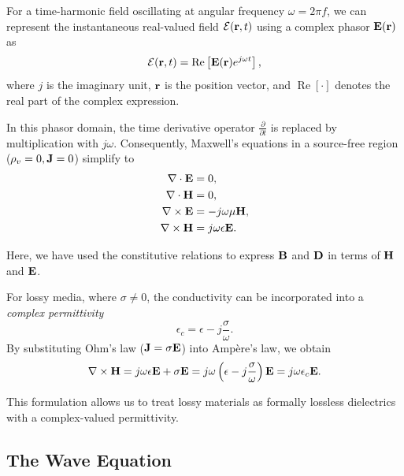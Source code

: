 For a time-harmonic field oscillating at angular frequency $\omega = 2\pi f$, we can represent the instantaneous real-valued field $\mathbf{\mathcal{E}}(\mathbf{r}, t)$ using a complex phasor $\mathbf{E}(\mathbf{r})$ as
\begin{equation}
  \mathbf{\mathcal{E}}(\mathbf{r}, t) = \operatorname{Re}\left[ \mathbf{E}(\mathbf{r}) e^{j\omega t} \right],
\end{equation}
where $j$ is the imaginary unit, $\mathbf{r}$ is the position vector, and $\operatorname{Re}\left[\cdot\right]$ denotes the real part of the complex expression.

In this phasor domain, the time derivative operator $\tfrac{\partial}{\partial t}$ is replaced by multiplication with $j\omega$. Consequently, Maxwell's equations in a source-free region ($\rho_v=0, \mathbf{J}=0$) simplify to
\begin{align}
  \nabla \cdot \mathbf{E} &= 0,\label{eq:th-gauss_elec}\\
  \nabla \cdot \mathbf{H} &= 0,\label{eq:th-div_mag}\\
  \nabla \times \mathbf{E} &= -j\omega \mu \mathbf{H},\label{eq:th-faraday}\\
  \nabla \times \mathbf{H} &= j\omega \epsilon \mathbf{E}.\label{eq:th-ampere_maxwell}
\end{align}

Here, we have used the constitutive relations to express $\mathbf{B}$ and $\mathbf{D}$ in terms of $\mathbf{H}$ and $\mathbf{E}$.

For lossy media, where $\sigma \neq 0$, the conductivity can be incorporated into a \emph{complex permittivity}
\begin{equation}
  \epsilon_c = \epsilon - j \frac{\sigma}{\omega}.
\end{equation}
By substituting Ohm's law ($\mathbf{J} = \sigma \mathbf{E}$) into Ampère's law, we obtain
\begin{equation}
  \nabla \times \mathbf{H} = j\omega \epsilon \mathbf{E} + \sigma \mathbf{E} = j\omega \left( \epsilon - j \frac{\sigma}{\omega} \right) \mathbf{E} = j\omega \epsilon_c \mathbf{E}.
\end{equation}

This formulation allows us to treat lossy materials as formally lossless dielectrics with a complex-valued permittivity.

\subsection{The Wave Equation}


